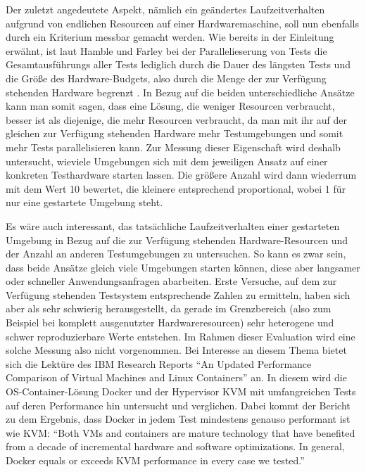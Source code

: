 Der zuletzt angedeutete Aspekt, nämlich ein geändertes Laufzeitverhalten aufgrund von endlichen Resourcen auf einer Hardwaremaschine, soll nun ebenfalls durch ein Kriterium messbar gemacht werden. Wie bereits in der Einleitung erwähnt, ist laut Hamble und Farley bei der Parallelieserung von Tests die Gesamtausführungs aller Tests lediglich durch die Dauer des längsten Tests und die Größe des Hardware-Budgets, also durch die Menge der zur Verfügung stehenden Hardware begrenzt \citep[Vgl.][S. 310]{HumFar10}. In Bezug auf die beiden unterschiedliche Ansätze kann man somit sagen, dass eine Lösung, die weniger Resourcen verbraucht, besser ist als diejenige, die mehr Resourcen verbraucht, da man mit ihr auf der gleichen zur Verfügung stehenden Hardware mehr Testumgebungen und somit mehr Tests parallelisieren kann. Zur Messung dieser Eigenschaft wird deshalb untersucht, wieviele Umgebungen sich mit dem jeweiligen Ansatz auf einer konkreten Testhardware starten lassen. Die größere Anzahl wird dann wiederrum mit dem Wert 10 bewertet, die kleinere entsprechend proportional, wobei 1 für nur eine gestartete Umgebung steht.

Es wäre auch interessant, das tatsächliche Laufzeitverhalten einer gestarteten Umgebung in Bezug auf die zur Verfügung stehenden Hardware-Resourcen und der Anzahl an anderen Testumgebungen zu untersuchen. So kann es zwar sein, dass beide Ansätze gleich viele Umgebungen starten können, diese aber langsamer oder schneller Anwendungsanfragen abarbeiten. Erste Versuche, auf dem zur Verfügung stehenden Testsystem entsprechende Zahlen zu ermitteln, haben sich aber als sehr schwierig herausgestellt, da gerade im Grenzbereich (also zum Beispiel bei komplett ausgenutzter Hardwareresourcen) sehr heterogene und schwer reproduzierbare Werte entstehen. Im Rahmen dieser Evaluation wird eine solche Messung also nicht vorgenommen. Bei Interesse an diesem Thema bietet sich die Lektüre des IBM Research Reports "`An Updated Performance Comparison of Virtual Machines and Linux Containers"' an. In diesem wird die OS-Container-Lösung Docker und der Hypervisor KVM mit umfangreichen Tests auf deren Performance hin untersucht und verglichen. Dabei kommt der Bericht zu dem Ergebnis, dass Docker in jedem Test mindestens genauso performant ist wie KVM: "`Both VMs and containers are mature technology that have benefited from a decade of incremental hardware and software optimizations. In general, Docker equals or exceeds KVM performance in every case we tested."' \citep[S.][Conclusion]{comparison}

